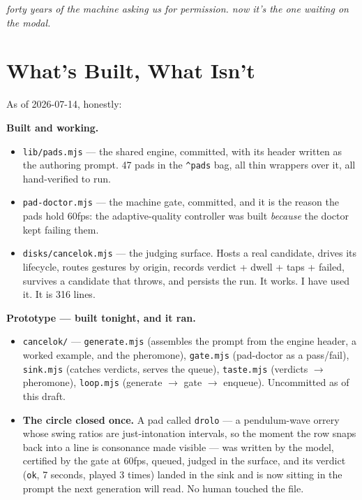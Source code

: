 \documentclass[10pt,letterpaper,twocolumn]{article}
\newcommand{\pull}[1]{%
  \par\vspace{0.4em}
  {\aclight\small\color{acpink}\itshape #1}\par
  \vspace{0.4em}}
\begin{document}
\pull{forty years of the machine asking us for permission. now it's the one waiting on the modal.}


\section{What's Built, What Isn't}

As of 2026-07-14, honestly:

\textbf{Built and working.}
\begin{itemize}
  \item \texttt{lib/pads.mjs} --- the shared engine, committed, with its header written as the authoring prompt. 47 pads in the \texttt{\^{}pads} bag, all thin wrappers over it, all hand-verified to run.
  \item \texttt{pad-doctor.mjs} --- the machine gate, committed, and it is the reason the pads hold 60fps: the adaptive-quality controller was built \emph{because} the doctor kept failing them.
  \item \texttt{disks/cancelok.mjs} --- the judging surface. Hosts a real candidate, drives its lifecycle, routes gestures by origin, records verdict + dwell + taps + failed, survives a candidate that throws, and persists the run. It works. I have used it. It is 316 lines.
\end{itemize}

\textbf{Prototype --- built tonight, and it ran.}
\begin{itemize}
  \item \texttt{cancelok/} --- \texttt{generate.mjs} (assembles the prompt from the engine header, a worked example, and the pheromone), \texttt{gate.mjs} (pad-doctor as a pass/fail), \texttt{sink.mjs} (catches verdicts, serves the queue), \texttt{taste.mjs} (verdicts $\rightarrow$ pheromone), \texttt{loop.mjs} (generate $\rightarrow$ gate $\rightarrow$ enqueue). Uncommitted as of this draft.
  \item \textbf{The circle closed once.} A pad called \texttt{drolo} --- a pendulum-wave orrery whose swing ratios are just-intonation intervals, so the moment the row snaps back into a line is consonance made visible --- was written by the model, certified by the gate at 60fps, queued, judged in the surface, and its verdict (\texttt{ok}, 7 seconds, played 3 times) landed in the sink and is now sitting in the prompt the next generation will read. No human touched the file.
\end{itemize}
\end{document}
